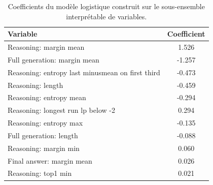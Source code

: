 \begin{table}[htbp]
\centering
\caption{Coefficients du modèle logistique construit sur le sous-ensemble interprétable de variables.}
\label{tab:logprob_top_manual_coefficients}
\begin{tabular}{lc}
\toprule
Variable & Coefficient \\
\midrule
Reasoning: margin mean & 1.526 \\
Full generation: margin mean & -1.257 \\
Reasoning: entropy last minusmean on first third & -0.473 \\
Reasoning: length & -0.459 \\
Reasoning: entropy mean & -0.294 \\
Reasoning: longest run lp below -2 & 0.294 \\
Reasoning: entropy max & -0.135 \\
Full generation: length & -0.088 \\
Reasoning: margin min & 0.060 \\
Final answer: margin mean & 0.026 \\
Reasoning: top1 min & 0.021 \\
\bottomrule
\end{tabular}

\end{table}
